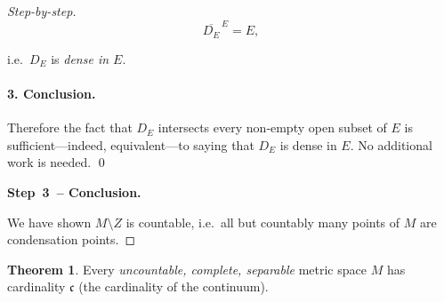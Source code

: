 \documentclass[12pt]{article}
\theoremstyle{definition} %
\newtheorem{theorem}{Theorem}
\theoremstyle{plain} %
\begin{document}
\begin{proof}[Step-by-step]
\[
    \overline{D_E}^{\,E}=E,
\]

i.e.\ \(D_E\) is \emph{dense in \(E\)}.

\paragraph{3.  Conclusion.}
Therefore the fact that \(D_E\) intersects every non‑empty open subset of
\(E\) is sufficient—indeed, equivalent—to saying that \(D_E\) is dense in
\(E\).  No additional work is needed.  \qed

  \medskip
  \textbf{Step 3 -- Conclusion.}

  We have shown \(M\setminus Z\) is countable, i.e.\ all but countably
  many points of \(M\) are condensation points.
\end{proof}
\begin{theorem}\label{thm:card_c}
  Every \emph{uncountable, complete, separable} metric space $M$
  has cardinality $\mathfrak c$ (the cardinality of the continuum).
\end{theorem}
\end{document}
